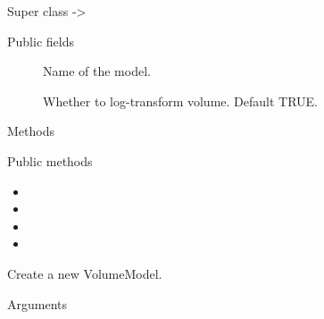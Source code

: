 \documentclass[a4paper]{book}
\begin{document}
%
\begin{Section}{Super class}
 -> 
\end{Section}
%
\begin{Section}{Public fields}

\begin{description}

\item[] Name of the model.

\item[] Whether to log-transform volume. Default TRUE.

\end{description}


\end{Section}
%
\begin{Section}{Methods}
%
\begin{SubSection}{Public methods}
\begin{itemize}

\item{} 
\item{} 
\item{} 
\item{} 

\end{itemize}

\end{SubSection}



\hypertarget{method-VolumeModel-initialize}{}
%
\begin{SubSection}{}
Create a new VolumeModel.
%

%
\begin{SubSubSection}{Arguments}

\begin{description}


\end{description}
\end{SubSubSection}
\end{SubSection}
\end{Section}
\end{document}
